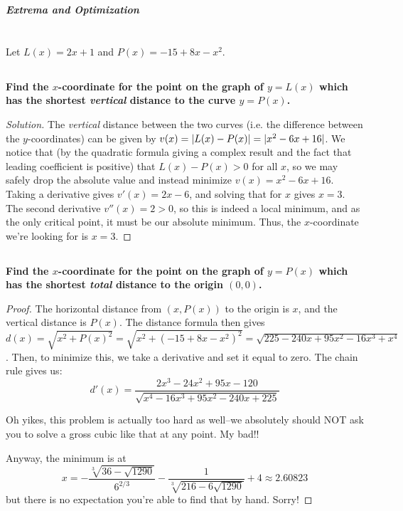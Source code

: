 \documentclass[english]{article}
\DeclarePairedDelimiter\abs{\lvert}{\rvert}%
\newcommand{\prob}[1]{\setcounter{section}{#1-1}\section{}}
\newcommand{\prt}[1]{\setcounter{subsection}{#1-1}\subsection{}}
\theoremstyle{remark}
\theoremstyle{definition}
\begin{document}
		
	\begin{center}{\Large\textbf{\emph{Extrema and Optimization}}}\end{center}
	\prob{10} Let $L(x)=2x+1$ and $P(x)=-15+8x-x^2$.
	\prt{1}\textbf{ Find the $x$-coordinate for the point on the graph of $y=L(x)$ which has the shortest \emph{vertical} distance to the curve $y=P(x)$. }\begin{proof}[Solution]
The \emph{vertical} distance between the two curves (i.e. the difference between the $y$-coordinates) can be given by $v(x)=\abs{L(x)-P(x)}=\abs{x^2 - 6 x + 16}$. We notice that (by the quadratic formula giving a complex result and the fact that leading coefficient is positive) that $L(x)-P(x)>0$ for all $x$, so we may safely drop the absolute value and instead minimize $v(x)=x^2-6x+16$. Taking a derivative gives $v'(x)=2x-6$, and solving that for $x$ gives $x=3$. The second derivative $v''(x)=2>0$, so this is indeed a local minimum, and as the only critical point, it must be our absolute minimum. Thus, the $x$-coordinate we're looking for is $x=3$. 		
	
	\end{proof}
	\prt{2}\textbf{ Find the $x$-coordinate for the point on the graph of $y=P(x)$ which has the shortest \emph{total} distance to the origin $(0,0)$. }\vspace{5cm}
	\begin{proof}
		The horizontal distance from $(x,P(x))$ to the origin is $x$, and the vertical distance is $P(x)$. The distance formula then gives $d(x)=\sqrt{x^2+P(x)^2}=\sqrt{x^2+(-15+8x-x^2)^2}=\sqrt{225 - 240 x + 95 x^2 - 16 x^3 + x^4}$. Then, to minimize this, we take a derivative and set it equal to zero. The chain rule gives us:$$d'(x)=\frac{2 x^3-24 x^2+95 x-120}{\sqrt{x^4-16 x^3+95 x^2-240 x+225}}$$
		
		Oh yikes, this problem is actually too hard as well--we absolutely should NOT ask you to solve a gross cubic like that at any point. My bad!!
		
		Anyway, the minimum is at $$x=-\frac{\sqrt[3]{36-\sqrt{1290}}}{6^{2/3}}-\frac{1}{\sqrt[3]{216-6 \sqrt{1290}}}+4\approx 2.60823$$
		but there is no expectation you're able to find that by hand. Sorry!
	\end{proof}
	
\end{document}
